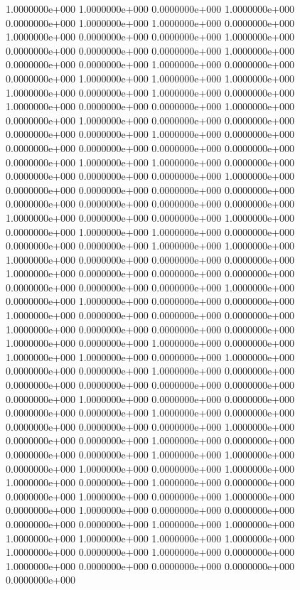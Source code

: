  1.0000000e+000  1.0000000e+000  0.0000000e+000  1.0000000e+000  0.0000000e+000
  1.0000000e+000  1.0000000e+000  0.0000000e+000  1.0000000e+000  0.0000000e+000
  0.0000000e+000  1.0000000e+000  0.0000000e+000  0.0000000e+000  0.0000000e+000
  1.0000000e+000  0.0000000e+000  0.0000000e+000  1.0000000e+000  0.0000000e+000
  0.0000000e+000  1.0000000e+000  1.0000000e+000  1.0000000e+000  1.0000000e+000
  0.0000000e+000  1.0000000e+000  0.0000000e+000  1.0000000e+000  0.0000000e+000
  0.0000000e+000  1.0000000e+000  0.0000000e+000  1.0000000e+000  0.0000000e+000
  0.0000000e+000  0.0000000e+000  0.0000000e+000  1.0000000e+000  0.0000000e+000
  0.0000000e+000  0.0000000e+000  0.0000000e+000  0.0000000e+000  0.0000000e+000
  1.0000000e+000  1.0000000e+000  0.0000000e+000  0.0000000e+000  0.0000000e+000
  0.0000000e+000  1.0000000e+000  0.0000000e+000  0.0000000e+000  0.0000000e+000
  0.0000000e+000  0.0000000e+000  0.0000000e+000  0.0000000e+000  0.0000000e+000
  1.0000000e+000  0.0000000e+000  0.0000000e+000  1.0000000e+000  0.0000000e+000
  1.0000000e+000  1.0000000e+000  0.0000000e+000  0.0000000e+000  0.0000000e+000
  1.0000000e+000  1.0000000e+000  1.0000000e+000  0.0000000e+000  0.0000000e+000
  0.0000000e+000  1.0000000e+000  0.0000000e+000  0.0000000e+000  0.0000000e+000
  0.0000000e+000  0.0000000e+000  0.0000000e+000  1.0000000e+000  0.0000000e+000
  1.0000000e+000  0.0000000e+000  0.0000000e+000  1.0000000e+000  0.0000000e+000
  0.0000000e+000  0.0000000e+000  1.0000000e+000  0.0000000e+000  0.0000000e+000
  0.0000000e+000  1.0000000e+000  0.0000000e+000  1.0000000e+000  0.0000000e+000
  1.0000000e+000  1.0000000e+000  0.0000000e+000  1.0000000e+000  0.0000000e+000
  0.0000000e+000  1.0000000e+000  0.0000000e+000  0.0000000e+000  0.0000000e+000
  0.0000000e+000  0.0000000e+000  0.0000000e+000  1.0000000e+000  0.0000000e+000
  0.0000000e+000  0.0000000e+000  0.0000000e+000  1.0000000e+000  0.0000000e+000
  0.0000000e+000  0.0000000e+000  0.0000000e+000  1.0000000e+000  0.0000000e+000
  0.0000000e+000  1.0000000e+000  0.0000000e+000  0.0000000e+000  0.0000000e+000
  1.0000000e+000  1.0000000e+000  0.0000000e+000  1.0000000e+000  0.0000000e+000
  1.0000000e+000  1.0000000e+000  0.0000000e+000  1.0000000e+000  0.0000000e+000
  0.0000000e+000  1.0000000e+000  0.0000000e+000  1.0000000e+000  0.0000000e+000
  1.0000000e+000  0.0000000e+000  0.0000000e+000  0.0000000e+000  0.0000000e+000
  1.0000000e+000  1.0000000e+000  1.0000000e+000  1.0000000e+000  1.0000000e+000
  1.0000000e+000  1.0000000e+000  0.0000000e+000  1.0000000e+000  0.0000000e+000
  1.0000000e+000  0.0000000e+000  0.0000000e+000  0.0000000e+000  0.0000000e+000
